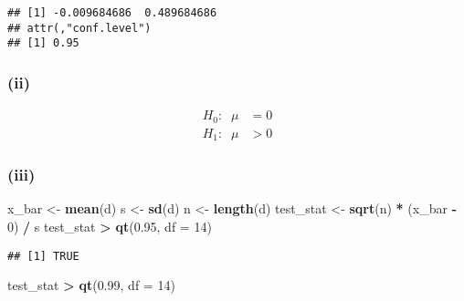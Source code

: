 \documentclass[
]{article}
\newenvironment{Shaded}{\begin{snugshade}}{\end{snugshade}}
\newcommand{\DataTypeTok}[1]{\textcolor[rgb]{0.13,0.29,0.53}{#1}}
\newcommand{\DecValTok}[1]{\textcolor[rgb]{0.00,0.00,0.81}{#1}}
\newcommand{\FloatTok}[1]{\textcolor[rgb]{0.00,0.00,0.81}{#1}}
\newcommand{\KeywordTok}[1]{\textcolor[rgb]{0.13,0.29,0.53}{\textbf{#1}}}
\newcommand{\NormalTok}[1]{#1}
\newcommand{\OperatorTok}[1]{\textcolor[rgb]{0.81,0.36,0.00}{\textbf{#1}}}
\newcommand{\StringTok}[1]{\textcolor[rgb]{0.31,0.60,0.02}{#1}}
\begin{document}
\begin{Shaded}
\end{Shaded}

\begin{verbatim}
## [1] -0.009684686  0.489684686
## attr(,"conf.level")
## [1] 0.95
\end{verbatim}

\hypertarget{ii}{%
\subsubsection{(ii)}\label{ii}}

\[\begin{aligned}
H_0: \; \; \mu &= 0 \\
H_1: \; \; \mu &> 0
\end{aligned}\]

\hypertarget{iii}{%
\subsubsection{(iii)}\label{iii}}

\begin{Shaded}
\begin{Highlighting}[]
\NormalTok{x_bar <-}\StringTok{ }\KeywordTok{mean}\NormalTok{(d)}
\NormalTok{s <-}\StringTok{ }\KeywordTok{sd}\NormalTok{(d)}
\NormalTok{n <-}\StringTok{ }\KeywordTok{length}\NormalTok{(d)}
\NormalTok{test_stat <-}\StringTok{ }\KeywordTok{sqrt}\NormalTok{(n) }\OperatorTok{*}\StringTok{ }\NormalTok{(x_bar }\OperatorTok{-}\StringTok{ }\DecValTok{0}\NormalTok{) }\OperatorTok{/}\StringTok{ }\NormalTok{s }
\NormalTok{test_stat }\OperatorTok{>}\StringTok{ }\KeywordTok{qt}\NormalTok{(}\FloatTok{0.95}\NormalTok{, }\DataTypeTok{df =} \DecValTok{14}\NormalTok{)}
\end{Highlighting}
\end{Shaded}

\begin{verbatim}
## [1] TRUE
\end{verbatim}

\begin{Shaded}
\begin{Highlighting}[]
\NormalTok{test_stat }\OperatorTok{>}\StringTok{ }\KeywordTok{qt}\NormalTok{(}\FloatTok{0.99}\NormalTok{, }\DataTypeTok{df =} \DecValTok{14}\NormalTok{)}
\end{Highlighting}
\end{Shaded}
\end{document}
